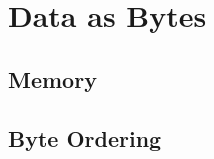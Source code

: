 \chapter{Data as Bytes}
\label{chap:bytes}

\section{Memory}
\label{sec:memory}

\section{Byte Ordering}
\label{sec:endianness}


